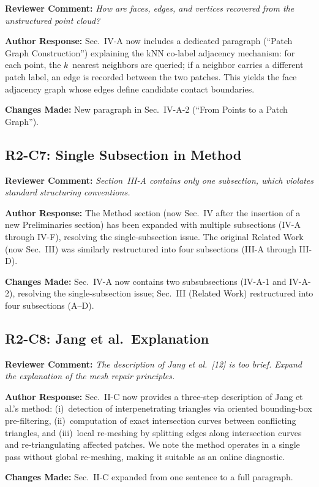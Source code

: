 \documentclass[11pt]{article}
\newcommand{\RC}[1]{\noindent\textcolor{revcolor}{\textbf{Reviewer Comment:} \emph{#1}}\par\medskip}
\newcommand{\AR}[1]{\noindent\textcolor{respcolor}{\textbf{Author Response:} #1}\par\medskip}
\newcommand{\CH}[1]{\noindent\textbf{Changes Made:} #1\par\bigskip}
\begin{document}
\RC{How are faces, edges, and vertices recovered from the
unstructured point cloud?}

\AR{Sec.~IV-A now includes a dedicated paragraph
(``Patch Graph Construction'') explaining the kNN co-label adjacency
mechanism: for each point, the $k$~nearest neighbors are queried;
if a neighbor carries a different patch label, an edge is recorded
between the two patches. This yields the face adjacency graph
whose edges define candidate contact boundaries.}

\CH{New paragraph in Sec.~IV-A-2 (``From Points to a Patch Graph'').}

\subsection*{R2-C7: Single Subsection in Method}

\RC{Section~III-A contains only one subsection, which violates
standard structuring conventions.}

\AR{The Method section (now Sec.~IV after the insertion of a new
Preliminaries section) has been expanded with multiple subsections
(IV-A through IV-F), resolving the single-subsection issue.
The original Related Work (now Sec.~III) was similarly restructured
into four subsections (III-A through III-D).}

\CH{Sec.~IV-A now contains two subsubsections (IV-A-1 and IV-A-2),
resolving the single-subsection issue; Sec.~III (Related Work)
restructured into four subsections (A--D).}

\subsection*{R2-C8: Jang et al.\ Explanation}

\RC{The description of Jang et al.\ [12] is too brief.
Expand the explanation of the mesh repair principles.}

\AR{Sec.~II-C now provides a three-step description of Jang et
al.'s method: (i)~detection of interpenetrating triangles via
oriented bounding-box pre-filtering, (ii)~computation of exact
intersection curves between conflicting triangles, and
(iii)~local re-meshing by splitting edges along intersection
curves and re-triangulating affected patches. We note the method
operates in a single pass without global re-meshing, making it
suitable as an online diagnostic.}

\CH{Sec.~II-C expanded from one sentence to a full paragraph.}
\end{document}
